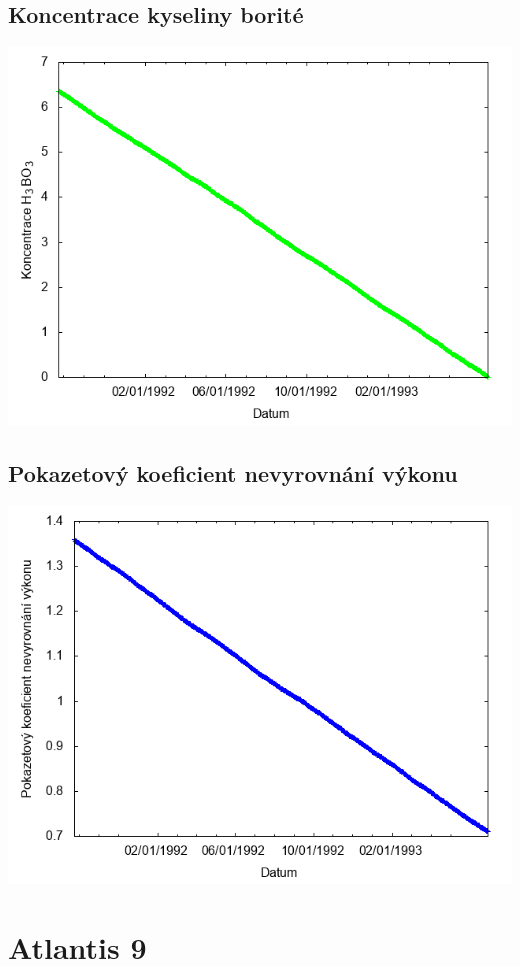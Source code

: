 \documentclass[a4paper,twoside,11pt]{article}
\begin{document}
\subsection*{Koncentrace kyseliny borité}
\begin{center}
\includegraphics[width=.8\textwidth]{graphs/Atlantis_08_bc.png}
\end{center}

\subsection*{Pokazetový koeficient nevyrovnání výkonu}
\begin{center}
\includegraphics[width=.8\textwidth]{graphs/Atlantis_08_fha.png}
\end{center}

\newpage
\section*{Atlantis 9}
\end{document}

